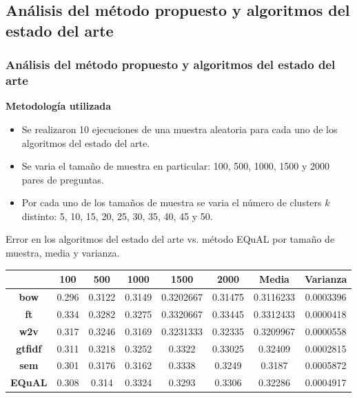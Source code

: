 \subsection{Análisis del método propuesto y algoritmos del estado del arte}
\begin{frame}
	\frametitle{Análisis del método propuesto y algoritmos del estado del arte}
	\textbf{Metodología utilizada}
	\bigskip

	\begin{itemize}[<*>]
		\item Se realizaron 10 ejecuciones de una muestra aleatoria para cada uno de los algoritmos del estado del arte.
		\item Se varia el tamaño de muestra en particular: 100, 500, 1000, 1500 y 2000 pares de preguntas.
		\item Por cada uno de los tamaños de muestra se varia el número de clusters \(k\) distinto: 5, 10, 15, 20, 25, 30, 35, 40, 45 y 50.
	\end{itemize}

	\framebreak

	Error en los algoritmos del estado del arte vs. método EQuAL por tamaño de muestra, media y varianza.
	\begin{table}[h!]
		\scriptsize
		\begin{tabularx}{\textwidth}{cccccccc}
			\toprule
			& \textbf{100} & \textbf{500} & \textbf{1000} & \textbf{1500} & \textbf{2000} & \textbf{Media} & \textbf{Varianza} \\
			\midrule
			\textbf{bow}      & 0.296 & 0.3122 & 0.3149 & 0.3202667 & 0.31475 & \cellcolor[HTML]{D9EAD3}0.3116233 & 0.0003396                          \\
			\textbf{ft}       & 0.334 & 0.3282 & 0.3275 & 0.3320667 & 0.33445 & 0.3312433                         & \cellcolor[HTML]{D9EAD3}0.0000418 \\
			\textbf{w2v}      & 0.317 & 0.3246 & 0.3169 & 0.3231333 & 0.32335 & 0.3209967                         & 0.0000558                         \\
			\textbf{gtfidf}   & 0.311 & 0.3218 & 0.3252 & 0.3322       & 0.33025 & 0.32409                              & 0.0002815                              \\
			\textbf{sem}      & 0.301 & 0.3176 & 0.3162 & 0.3338       & 0.3249  & 0.3187                               & 0.0005872                                \\
			\textbf{EQuAL} & 0.308 & 0.314  & 0.3324 & 0.3293       & 0.3306  & 0.32286                              & 0.0004917                              \\
			\bottomrule
		\end{tabularx}
		\label{tab:error-arte-equal}
	\end{table}


\end{frame}
